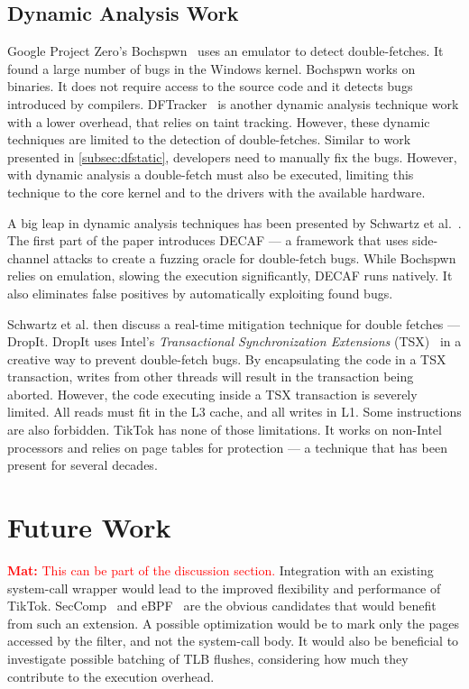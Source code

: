 \documentclass[conference]{IEEEtran}
\newcommand{\mat}[1]{\textcolor{red}{\textbf{Mat:} #1}}
\newcommand{\sysname}{TikTok}
\begin{document}
\subsection{Dynamic Analysis Work}
\label{subsec:dfdynamic}
Google Project Zero's Bochspwn~\cite{jurczyk2013bochspwn} uses an emulator to
detect double-fetches. It found a large number of bugs in the Windows kernel.
Bochspwn works on binaries. It does not require access to the source code and it
detects bugs introduced by compilers. DFTracker~\cite{wang2019dftracker} is
another dynamic analysis technique work with a lower overhead, that relies on
taint tracking. However, these dynamic techniques are limited to the detection
of double-fetches. Similar to work presented in \autoref{subsec:dfstatic},
developers need to manually fix the bugs. However, with dynamic analysis a
double-fetch must also be executed, limiting this technique to the core kernel
and to the drivers with the available hardware.

A big leap in dynamic analysis techniques has been presented by Schwartz et
al.~\cite{schwarz2018automated}. The first part of the paper introduces DECAF
--- a framework that uses side-channel attacks to create a fuzzing oracle for
double-fetch bugs. While Bochspwn relies on emulation, slowing the execution
significantly, DECAF runs natively. It also eliminates false positives by
automatically exploiting found bugs.

Schwartz et al. then discuss a real-time mitigation technique for double fetches
--- DropIt. DropIt uses Intel's \emph{Transactional Synchronization Extensions}
(TSX)~\cite{intel64and} in a creative way to prevent double-fetch bugs. By
encapsulating the code in a TSX transaction, writes from other threads will
result in the transaction being aborted. However, the code executing inside a
TSX transaction is severely limited. All reads must fit in the L3 cache, and all
writes in L1. Some instructions are also forbidden. \sysname{} has none of those
limitations. It works on non-Intel processors and relies on page tables for
protection --- a technique that has been present for several decades.

\section{Future Work}
\label{sec:furtherwork}
\mat{This can be part of the discussion section.}
Integration with an existing system-call wrapper would lead to the improved
flexibility and performance of \sysname. SecComp~\cite{seccomp} and
eBPF~\cite{ebpf} are the obvious candidates that would benefit from such an
extension. A possible optimization would be to mark only the pages accessed by
the filter, and not the system-call body. It would also be beneficial to
investigate possible batching of TLB flushes, considering how much they
contribute to the execution overhead.
\end{document}
